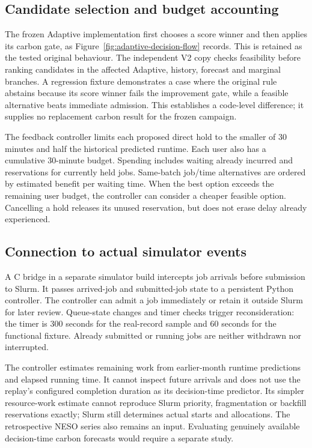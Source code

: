 \subsection{Candidate selection and budget accounting}
The frozen Adaptive implementation first chooses a score winner and then applies its carbon gate, as Figure~\ref{fig:adaptive-decision-flow} records. This is retained as the tested original behaviour. The independent V2 copy checks feasibility before ranking candidates in the affected Adaptive, history, forecast and marginal branches. A regression fixture demonstrates a case where the original rule abstains because its score winner fails the improvement gate, while a feasible alternative beats immediate admission. This establishes a code-level difference; it supplies no replacement carbon result for the frozen campaign.

The feedback controller limits each proposed direct hold to the smaller of 30 minutes and half the historical predicted runtime. Each user also has a cumulative 30-minute budget. Spending includes waiting already incurred and reservations for currently held jobs. Same-batch job/time alternatives are ordered by estimated benefit per waiting time. When the best option exceeds the remaining user budget, the controller can consider a cheaper feasible option. Cancelling a hold releases its unused reservation, but does not erase delay already experienced.

\subsection{Connection to actual simulator events}
A C bridge in a separate simulator build intercepts job arrivals before submission to Slurm. It passes arrived-job and submitted-job state to a persistent Python controller. The controller can admit a job immediately or retain it outside Slurm for later review. Queue-state changes and timer checks trigger reconsideration: the timer is 300 seconds for the real-record sample and 60 seconds for the functional fixture. Already submitted or running jobs are neither withdrawn nor interrupted.

The controller estimates remaining work from earlier-month runtime predictions and elapsed running time. It cannot inspect future arrivals and does not use the replay's configured completion duration as its decision-time predictor. Its simpler resource-work estimate cannot reproduce Slurm priority, fragmentation or backfill reservations exactly; Slurm still determines actual starts and allocations. The retrospective NESO series also remains an input. Evaluating genuinely available decision-time carbon forecasts would require a separate study.

